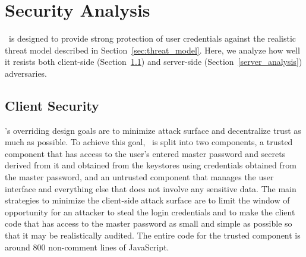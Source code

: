 \section{Security Analysis} \label{design_security_analysis}


\SecPass\ is designed to provide strong protection of user credentials against the realistic threat model described in Section~\ref{sec:threat_model}. Here, we analyze how well it resists both client-side (Section~\ref{sec:client_side_security_analysis}) and server-side (Section~\ref{server_analysis}) adversaries.

\subsection{Client Security} \label{sec:client_side_security_analysis}

\SecPass's overriding design goals are to minimize attack surface and decentralize trust as much as possible. To achieve this goal, \SecPass\ is split into two components, a trusted component that has access to the user's entered master password and secrets derived from it and obtained from the keystores using credentials obtained from the master password, and an untrusted component that manages the user interface and everything else that does not involve any sensitive data.  The main strategies to minimize the client-side attack surface are to limit the window of opportunity for an attacker to steal the login credentials and to make the client code that has access to the master password as small and simple as possible so that it may be realistically audited.  The entire code for the trusted component is around 800 non-comment lines of JavaScript. %

